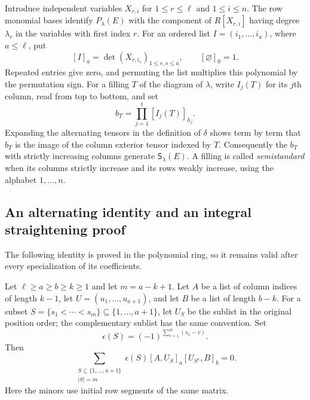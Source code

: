 Introduce independent variables $X_{r,i}$ for
$1\leq r\leq\ell$ and $1\leq i\leq n$.
The row monomial bases identify $P_\lambda(E)$ with the component of
$R[X_{r,i}]$ having degree $\lambda_r$ in the variables with first
index $r$. For an ordered list $I=(i_1,\ldots,i_a)$, where
$a\leq\ell$, put
\[
 [I]_a=\det(X_{r,i_s})_{1\leq r,s\leq a},
 \qquad [\varnothing]_0=1.
\]
Repeated entries give zero, and permuting the list multiplies this
polynomial by the permutation sign.
For a filling $T$ of the diagram of $\lambda$, write $I_j(T)$ for its
$j$th column, read from top to bottom, and set
\begin{equation}
 b_T=\prod_{j=1}^{t}[I_j(T)]_{h_j}.
 \label{eq:plethysm-flag-polynomial}
\end{equation}
Expanding the alternating tensors in the definition of $\delta$
shows term by term that $b_T$ is the image of the column exterior
tensor indexed by $T$. Consequently the $b_T$ with strictly increasing
columns generate $\mathsf S_\lambda(E)$. A filling is called
\emph{semistandard} when its columns strictly increase and its rows
weakly increase, using the alphabet $1,\ldots,n$.

\subsection{An alternating identity and an integral straightening proof}

The following identity is proved in the polynomial ring, so it
remains valid after every specialization of its coefficients.

\begin{lemma}
\label{lem:plethysm-shuffle}
Let $\ell\geq a\geq b\geq k\geq1$ and let $m=a-k+1$.
Let $A$ be a list of column indices of length $k-1$,
let $U=(u_1,\ldots,u_{a+1})$,
and let $B$ be a list of length $b-k$. For a subset
$S=\{s_1<\cdots<s_m\}\subseteq\{1,\ldots,a+1\}$, let $U_S$
be the sublist in the original position order; the complementary
sublist has the same convention. Set
\[
 \epsilon(S)=(-1)^{\sum_{v=1}^{m}(s_v-v)}.
\]
Then
\begin{equation}
 \sum_{\substack{S\subseteq\{1,\ldots,a+1\}\\|S|=m}}
 \epsilon(S)[A,U_S]_a[U_{S^c},B]_b=0.
 \label{eq:plethysm-shuffle}
\end{equation}
Here the minors use initial row segments of the same matrix.
\end{lemma}

